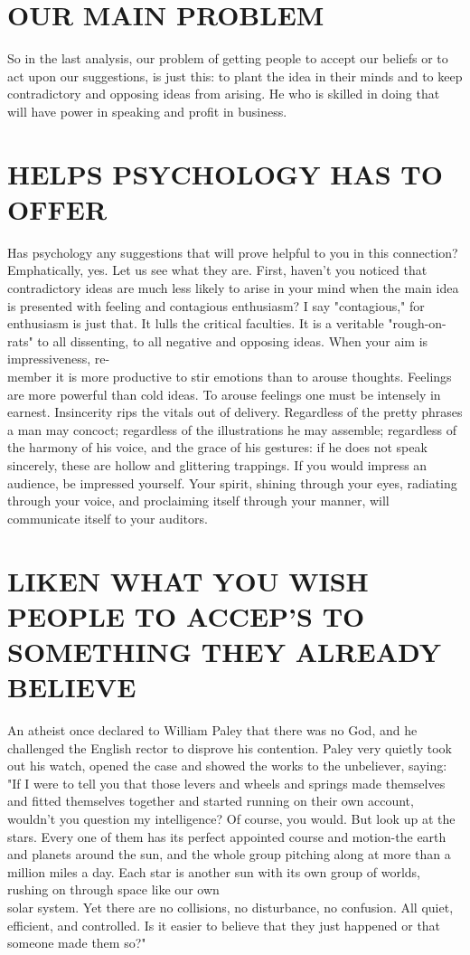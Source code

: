 \documentclass[10pt]{article}
\begin{document}
\section*{OUR MAIN PROBLEM}
So in the last analysis, our problem of getting people to accept our beliefs or to act upon our suggestions, is just this: to plant the idea in their minds and to keep contradictory and opposing ideas from arising. He who is skilled in doing that will have power in speaking and profit in business.

\section*{HELPS PSYCHOLOGY HAS TO OFFER}
Has psychology any suggestions that will prove helpful to you in this connection? Emphatically, yes. Let us see what they are. First, haven't you noticed that contradictory ideas are much less likely to arise in your mind when the main idea is presented with feeling and contagious enthusiasm? I say "contagious," for enthusiasm is just that. It lulls the critical faculties. It is a veritable "rough-on-rats" to all dissenting, to all negative and opposing ideas. When your aim is impressiveness, re-\\
member it is more productive to stir emotions than to arouse thoughts. Feelings are more powerful than cold ideas. To arouse feelings one must be intensely in earnest. Insincerity rips the vitals out of delivery. Regardless of the pretty phrases a man may concoct; regardless of the illustrations he may assemble; regardless of the harmony of his voice, and the grace of his gestures: if he does not speak sincerely, these are hollow and glittering trappings. If you would impress an audience, be impressed yourself. Your spirit, shining through your eyes, radiating through your voice, and proclaiming itself through your manner, will communicate itself to your auditors.

\section*{LIKEN WHAT YOU WISH PEOPLE TO ACCEP'S TO SOMETHING THEY ALREADY BELIEVE}
An atheist once declared to William Paley that there was no God, and he challenged the English rector to disprove his contention. Paley very quietly took out his watch, opened the case and showed the works to the unbeliever, saying: "If I were to tell you that those levers and wheels and springs made themselves and fitted themselves together and started running on their own account, wouldn't you question my intelligence? Of course, you would. But look up at the stars. Every one of them has its perfect appointed course and motion-the earth and planets around the sun, and the whole group pitching along at more than a million miles a day. Each star is another sun with its own group of worlds, rushing on through space like our own\\
solar system. Yet there are no collisions, no disturbance, no confusion. All quiet, efficient, and controlled. Is it easier to believe that they just happened or that someone made them so?"
\end{document}
